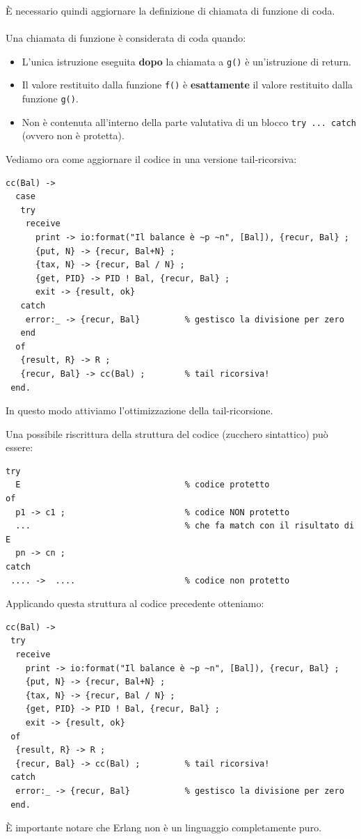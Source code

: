 \documentclass{article}
\begin{document}
È necessario quindi aggiornare la definizione di chiamata di funzione di coda.\\
\\Una chiamata di funzione è considerata di coda quando:
\begin{itemize}
    \item L'unica istruzione eseguita \textbf{dopo} la chiamata a \texttt{g()} è un'istruzione di return.
    \item Il valore restituito dalla funzione \texttt{f()} è \textbf{esattamente} il valore restituito dalla funzione \texttt{g()}.
    \item Non è contenuta all'interno della parte valutativa di un blocco \texttt{try ... catch} (ovvero non è protetta).
\end{itemize}
\vspace{8pt}
Vediamo ora come aggiornare il codice in una versione tail-ricorsiva:
\begin{tcolorbox}
\begin{verbatim}
cc(Bal) ->
  case
   try
    receive
      print -> io:format("Il balance è ~p ~n", [Bal]), {recur, Bal} ;
      {put, N} -> {recur, Bal+N} ;
      {tax, N} -> {recur, Bal / N} ;
      {get, PID} -> PID ! Bal, {recur, Bal} ;
      exit -> {result, ok}
   catch
    error:_ -> {recur, Bal}         % gestisco la divisione per zero
   end
  of
   {result, R} -> R ;
   {recur, Bal} -> cc(Bal) ;        % tail ricorsiva!
 end.
\end{verbatim}
\end{tcolorbox}
\vspace{8pt}
In questo modo attiviamo l'ottimizzazione della tail-ricorsione.

Una possibile riscrittura della struttura del codice (zucchero sintattico) può essere:
\begin{tcolorbox}
\begin{verbatim}
try
  E                                 % codice protetto
of
  p1 -> c1 ;                        % codice NON protetto
  ...                               % che fa match con il risultato di E
  pn -> cn ;
catch
 .... ->  ....                      % codice non protetto
\end{verbatim}
\end{tcolorbox}

\pagebreak

Applicando questa struttura al codice precedente otteniamo:
\begin{tcolorbox}
\begin{verbatim}
cc(Bal) ->
 try
  receive
    print -> io:format("Il balance è ~p ~n", [Bal]), {recur, Bal} ;
    {put, N} -> {recur, Bal+N} ;
    {tax, N} -> {recur, Bal / N} ;
    {get, PID} -> PID ! Bal, {recur, Bal} ;
    exit -> {result, ok}
 of
  {result, R} -> R ;
  {recur, Bal} -> cc(Bal) ;         % tail ricorsiva!
 catch
  error:_ -> {recur, Bal}           % gestisco la divisione per zero
 end.
\end{verbatim}
\end{tcolorbox}
\vspace{14pt}
È importante notare che Erlang non è un linguaggio completamente puro.
\end{document}
